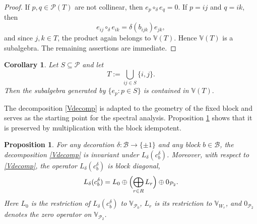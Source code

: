 \documentclass[10pt,a4paper]{amsart}
\newtheorem{proposition}[theorem]{Proposition}
\newtheorem{corollary}[theorem]{Corollary}
\numberwithin{equation}{section}
\def\valg{\mathbb{V}}
\begin{document}
\begin{proof}
If $p,q\in\mathcal P(T)$ are not collinear, then $e_p\circ_\delta e_q=0$. If $p=ij$ and $q=ik$, then \[ e_{ij}\circ_\delta e_{ik} = \delta(b_{ijk})e_{jk}, \] and since $j,k\in T$, the product again belongs to $\valg(T)$. Hence $\valg(T)$ is a subalgebra. The remaining assertions are immediate.
\end{proof}



\begin{corollary}\label{cor:where} Let $S\subseteq\mathcal{P}$ and let $$ T:=\bigcup_{ij\in S}\{i,j\}. $$ Then the subalgebra generated by $\{e_p:p\in S\}$ is contained in $\valg(T).$ \end{corollary}

The decomposition \eqref{Vdecomp} is adapted to the geometry of the fixed block and serves as the starting point for the spectral analysis. Proposition \ref{prop:blockdecomp} shows that it is preserved by multiplication with the block idempotent.

\begin{proposition}\label{prop:blockdecomp}
For any decoration $\delta:\mathcal{B}\to\{\pm1\}$ and any block $b\in\mathcal B$, the decomposition \eqref{Vdecomp} is invariant under $L_\delta(c_b^\delta)$. Moreover, with respect to \eqref{Vdecomp}, the operator $L_\delta(c_b^\delta)$ is block diagonal,
\begin{equation}\label{blockdiag}
L_\delta(c_b^\delta)
=
L_0
\oplus
\Bigl(
\bigoplus_{r\in R}L_r
\Bigr)
\oplus
0_{\mathcal{P}_2}.
\end{equation}
Here $L_0$ is the restriction of $L_\delta(c_b^\delta)$ to $\valg_{\mathcal{P}_0}$, $L_r$ is its restriction to $\valg_{W_r}$, and $0_{\mathcal{P}_2}$ denotes the zero operator on $\valg_{\mathcal{P}_2}$.
\end{proposition}
\end{document}
